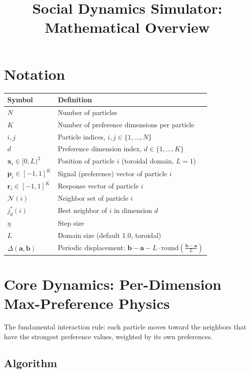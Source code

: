 \documentclass[11pt,a4paper]{article}
\title{Social Dynamics Simulator:\\Mathematical Overview}
\author{}
\date{}
\begin{document}
\maketitle
\tableofcontents
\newpage

\section{Notation}

\begin{tabular}{ll}
\toprule
\textbf{Symbol} & \textbf{Definition} \\
\midrule
$N$ & Number of particles \\
$K$ & Number of preference dimensions per particle \\
$i, j$ & Particle indices, $i, j \in \{1, \ldots, N\}$ \\
$d$ & Preference dimension index, $d \in \{1, \ldots, K\}$ \\
$\mathbf{x}_i \in [0, L)^2$ & Position of particle $i$ (toroidal domain, $L = 1$) \\
$\mathbf{p}_i \in [-1, 1]^K$ & Signal (preference) vector of particle $i$ \\
$\mathbf{r}_i \in [-1, 1]^K$ & Response vector of particle $i$ \\
$\mathcal{N}(i)$ & Neighbor set of particle $i$ \\
$j^*_d(i)$ & Best neighbor of $i$ in dimension $d$ \\
$\eta$ & Step size \\
$L$ & Domain size (default 1.0, toroidal) \\
$\Delta(\mathbf{a}, \mathbf{b})$ & Periodic displacement: $\mathbf{b} - \mathbf{a} - L \cdot \mathrm{round}\!\left(\frac{\mathbf{b} - \mathbf{a}}{L}\right)$ \\
\bottomrule
\end{tabular}

\section{Core Dynamics: Per-Dimension Max-Preference Physics}

The fundamental interaction rule: each particle moves toward the neighbors that have the strongest preference values, weighted by its own preferences.

\subsection{Algorithm}
\end{document}
